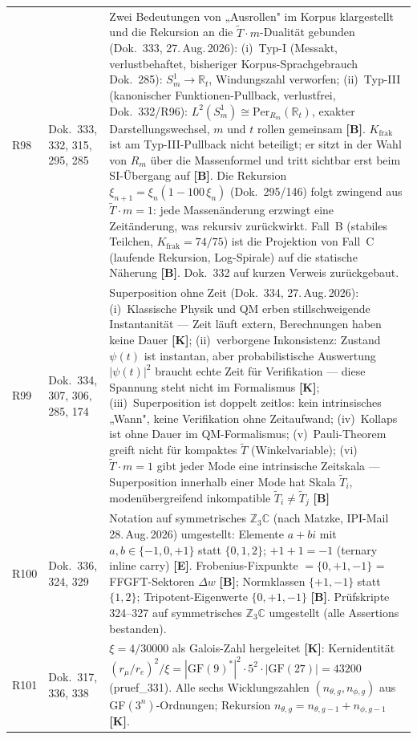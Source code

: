 \begin{longtable}{@{}p{0.9cm}p{3.1cm}p{10.2cm}@{}}
R98 & Dok.~333, 332, 315, 295, 285 & Zwei Bedeutungen von „Ausrollen" im Korpus klargestellt und die Rekursion an die $\tilde{T}\cdot m$-Dualität gebunden (Dok.~333, 27.\,Aug.\,2026): (i)~Typ-I (Messakt, verlustbehaftet, bisheriger Korpus-Sprachgebrauch Dok.~285): $S^1_m\to\mathbb{R}_t$, Windungszahl verworfen; (ii)~Typ-III (kanonischer Funktionen-Pullback, verlustfrei, Dok.~332/R96): $L^2(S^1_m)\cong\mathrm{Per}_{R_m}(\mathbb{R}_t)$, exakter Darstellungswechsel, $m$ und $t$ rollen gemeinsam \textbf{[B]}. $K_{\text{frak}}$ ist am Typ-III-Pullback nicht beteiligt; er sitzt in der Wahl von $R_m$ über die Massenformel und tritt sichtbar erst beim SI-Übergang auf \textbf{[B]}. Die Rekursion $\xi_{n+1}=\xi_n(1-100\,\xi_n)$ (Dok.~295/146) folgt zwingend aus $\tilde{T}\cdot m=1$: jede Massenänderung erzwingt eine Zeitänderung, was rekursiv zurückwirkt. Fall~B (stabiles Teilchen, $K_{\text{frak}}=74/75$) ist die Projektion von Fall~C (laufende Rekursion, Log-Spirale) auf die statische Näherung \textbf{[B]}. Dok.~332 auf kurzen Verweis zurückgebaut. \\
R99 & Dok.~334, 307, 306, 285, 174 & Superposition ohne Zeit (Dok.~334, 27.\,Aug.\,2026): (i)~Klassische Physik und QM erben stillschweigende Instantanität — Zeit läuft extern, Berechnungen haben keine Dauer \textbf{[K]}; (ii)~verborgene Inkonsistenz: Zustand $\psi(t)$ ist instantan, aber probabilistische Auswertung $|\psi(t)|^2$ braucht echte Zeit für Verifikation — diese Spannung steht nicht im Formalismus \textbf{[K]}; (iii)~Superposition ist doppelt zeitlos: kein intrinsisches „Wann", keine Verifikation ohne Zeitaufwand; (iv)~Kollaps ist ohne Dauer im QM-Formalismus; (v)~Pauli-Theorem greift nicht für kompaktes $\tilde{T}$ (Winkelvariable); (vi)~$\tilde{T}\cdot m=1$ gibt jeder Mode eine intrinsische Zeitskala — Superposition innerhalb einer Mode hat Skala $\tilde{T}_i$, modenübergreifend inkompatible $\tilde{T}_i\neq\tilde{T}_j$ \textbf{[B]} \\
R100 & Dok.~336, 324, 329 & Notation auf symmetrisches $\mathbb{Z}_3\mathbb{C}$ (nach Matzke, IPI-Mail 28.\,Aug.\,2026) umgestellt: Elemente $a+bi$ mit $a,b\in\{-1,0,+1\}$ statt $\{0,1,2\}$; $+1+1=-1$ (ternary inline carry) \textbf{[E]}. Frobenius-Fixpunkte $= \{0,+1,-1\}$ = FFGFT-Sektoren $\Delta w$ \textbf{[B]}; Normklassen $\{+1,-1\}$ statt $\{1,2\}$; Tripotent-Eigenwerte $\{0,+1,-1\}$ \textbf{[B]}. Prüfskripte 324--327 auf symmetrisches $\mathbb{Z}_3\mathbb{C}$ umgestellt (alle Assertions bestanden). \\
R101 & Dok.~317, 336, 338 & $\xi=4/30000$ als Galois-Zahl hergeleitet \textbf{[K]}: Kernidentität $(r_\mu/r_e)^2/\xi = |\text{GF}(9)^*|^2\cdot5^2\cdot|\text{GF}(27)| = 43200$ (pruef\_331). Alle sechs Wicklungszahlen $(n_{\theta,g},n_{\phi,g})$ aus GF$(3^n)$-Ordnungen; Rekursion $n_{\theta,g}=n_{\theta,g-1}+n_{\phi,g-1}$ \textbf{[K]}. \\

\end{longtable}
